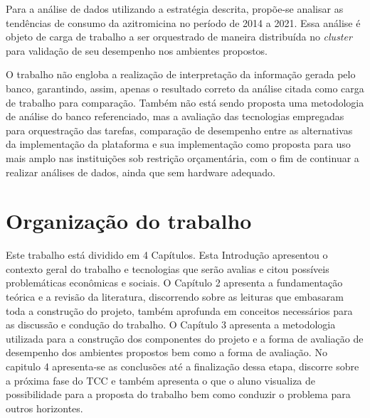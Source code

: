 Para a análise de dados utilizando a estratégia descrita, propõe-se analisar as tendências de consumo da azitromicina no período de 2014 a 2021. Essa análise é objeto de carga de trabalho a ser orquestrado de maneira distribuída no \emph{cluster} para validação de seu desempenho nos ambientes propostos.

O trabalho não engloba a realização de interpretação da informação gerada pelo banco, garantindo, assim, apenas o resultado correto da análise citada como carga de trabalho para comparação. Também não está sendo proposta uma metodologia de análise do banco referenciado, mas a avaliação das tecnologias empregadas para orquestração das tarefas, comparação de desempenho entre as alternativas da implementação da plataforma e sua implementação como proposta para uso mais amplo nas instituições sob restrição orçamentária, com o fim de continuar a realizar análises de dados, ainda que sem hardware adequado.


\section{Organização do trabalho}
\label{sec:organizacaoTrabalho}

Este trabalho está dividido em 4 Capítulos. Esta Introdução apresentou o contexto geral do trabalho e tecnologias que serão avalias e citou possíveis problemáticas econômicas e sociais. O Capítulo 2 apresenta a fundamentação teórica e a revisão da literatura, discorrendo sobre as leituras que embasaram toda a construção do projeto, também aprofunda em conceitos necessários para as discussão e condução do trabalho. O Capítulo 3 apresenta a  metodologia utilizada para a construção dos componentes do projeto e a forma de avaliação de desempenho dos ambientes propostos bem como a forma de avaliação. No capitulo 4 apresenta-se as conclusões até a finalização dessa etapa, discorre sobre a próxima fase do TCC e também apresenta o que o aluno visualiza de possibilidade para a proposta do trabalho bem como conduzir o problema para outros horizontes. 